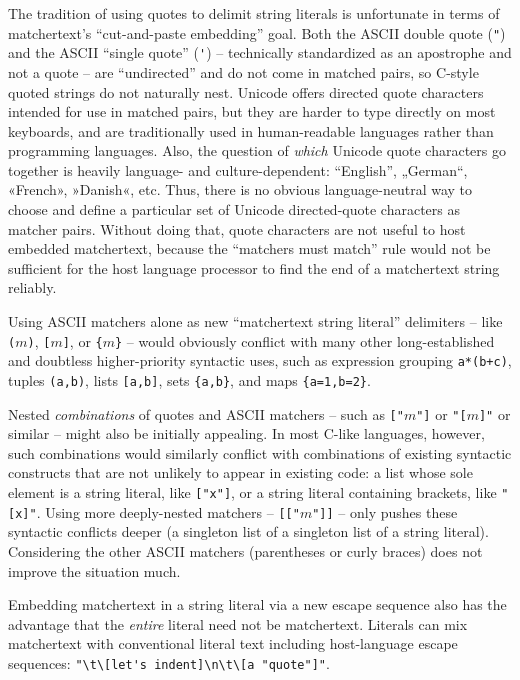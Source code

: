 The tradition of using quotes to delimit string literals
is unfortunate in terms of matchertext's ``cut-and-paste embedding'' goal.
Both the ASCII double quote (\verb|"|)
and the ASCII ``single quote'' (\verb|'|) --
technically standardized as an apostrophe and not a quote --
are ``undirected'' and do not come in matched pairs,
so C-style quoted strings do not naturally nest.
Unicode offers directed quote characters
intended for use in matched pairs,
but they are harder to type directly on most keyboards,
and are traditionally used in human-readable languages
rather than programming languages.
Also, the question of \emph{which} Unicode quote characters go together
is heavily language- and culture-dependent:
\eg “English”, „German“, «French», »Danish«, etc.
Thus, there is no obvious language-neutral way to choose and define
a particular set of Unicode directed-quote characters as matcher pairs.
Without doing that,
quote characters are not useful to host embedded matchertext,
because the ``matchers must match'' rule would not be sufficient
for the host language processor
to find the end of a matchertext string reliably.

Using ASCII matchers alone as new ``matchertext string literal'' delimiters --
like \verb|(|$m$\verb|)|, \verb|[|$m$\verb|]|, or \verb|{|$m$\verb|}| --
would obviously conflict with
many other long-established and doubtless higher-priority syntactic uses,
such as expression grouping \verb|a*(b+c)|, tuples \verb|(a,b)|,
lists \verb|[a,b]|, sets \verb|{a,b}|, and maps \verb|{a=1,b=2}|.

Nested \emph{combinations} of quotes and ASCII matchers --
such as \verb|["|$m$\verb|"]| or \verb|"[|$m$\verb|]"| or similar --
might also be initially appealing.
In most C-like languages, however,
such combinations would similarly conflict
with combinations of existing syntactic constructs
that are not unlikely to appear in existing code:
\eg a list whose sole element is a string literal, like \verb|["x"]|,
or a string literal containing brackets, like \verb|"[x]"|.
Using more deeply-nested matchers -- \eg \verb|[["|$m$\verb|"]]| --
only pushes these syntactic conflicts deeper
(a singleton list of a singleton list of a string literal).
Considering the other ASCII matchers (parentheses or curly braces)
does not improve the situation much.

Embedding matchertext in a string literal via a new escape sequence
also has the advantage that the \emph{entire} literal need not be matchertext.
Literals can mix matchertext with conventional literal text
including host-language escape sequences:
\eg \verb|"\t\[let's indent]\n\t\[a "quote"]"|.

